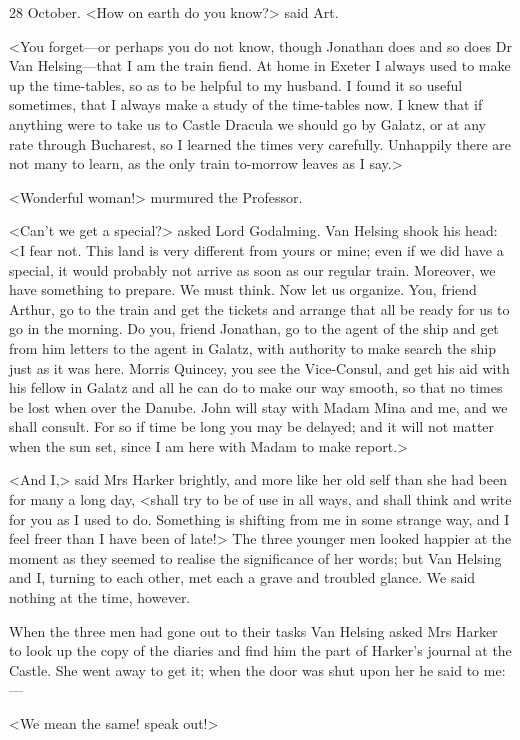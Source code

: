 \begin{diary}{28 October.}
<How on earth do you know?> said Art.

<You forget—or perhaps you do not know, though Jonathan does and so does Dr Van Helsing—that I am the train fiend. At home in Exeter I always used to make up the time-tables, so as to be helpful to my husband. I found it so useful sometimes, that I always make a study of the time-tables now. I knew that if anything were to take us to Castle Dracula we should go by Galatz, or at any rate through Bucharest, so I learned the times very carefully. Unhappily there are not many to learn, as the only train to-morrow leaves as I say.>

<Wonderful woman!> murmured the Professor.

<Can't we get a special?> asked Lord Godalming. Van Helsing shook his head: <I fear not. This land is very different from yours or mine; even if we did have a special, it would probably not arrive as soon as our regular train. Moreover, we have something to prepare. We must think. Now let us organize. You, friend Arthur, go to the train and get the tickets and arrange that all be ready for us to go in the morning. Do you, friend Jonathan, go to the agent of the ship and get from him letters to the agent in Galatz, with authority to make search the ship just as it was here. Morris Quincey, you see the Vice-Consul, and get his aid with his fellow in Galatz and all he can do to make our way smooth, so that no times be lost when over the Danube. John will stay with Madam Mina and me, and we shall consult. For so if time be long you may be delayed; and it will not matter when the sun set, since I am here with Madam to make report.>

<And I,> said Mrs Harker brightly, and more like her old self than she had been for many a long day, <shall try to be of use in all ways, and shall think and write for you as I used to do. Something is shifting from me in some strange way, and I feel freer than I have been of late!> The three younger men looked happier at the moment as they seemed to realise the significance of her words; but Van Helsing and I, turning to each other, met each a grave and troubled glance. We said nothing at the time, however.

When the three men had gone out to their tasks Van Helsing asked Mrs Harker to look up the copy of the diaries and find him the part of Harker's journal at the Castle. She went away to get it; when the door was shut upon her he said to me:—

<We mean the same! speak out!>


\end{diary}

